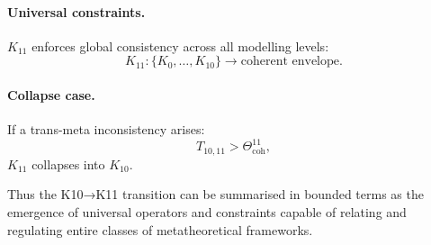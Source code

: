 \paragraph{Universal constraints.}
$K_{11}$ enforces global consistency across all modelling levels:
\[
K_{11} : \{K_0,\dots,K_{10}\} \rightarrow \text{coherent envelope}.
\]

\paragraph{Collapse case.}
If a trans-meta inconsistency arises:
\[
T_{10,11} > \Theta^{11}_{\mathrm{coh}},
\]
$K_{11}$ collapses into $K_{10}$.

Thus the K10→K11 transition can be summarised in bounded terms as the
emergence of universal operators and constraints capable of relating and
regulating entire classes of metatheoretical frameworks.

